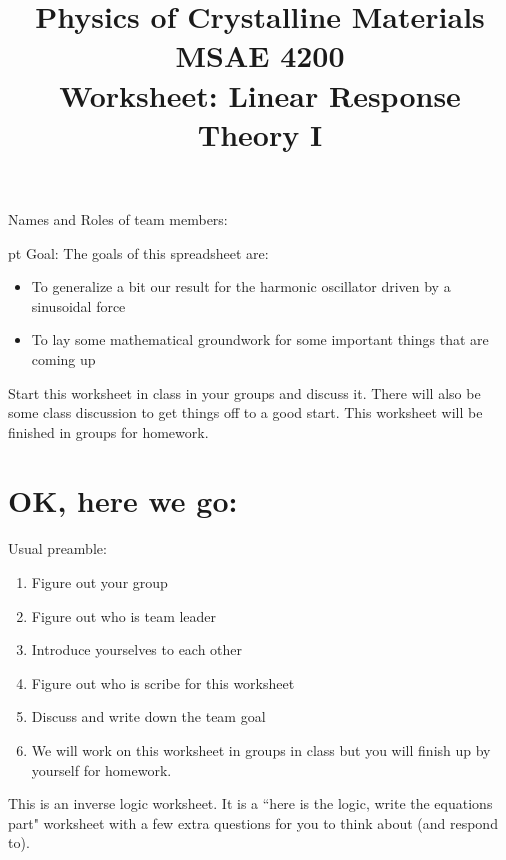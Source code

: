 \documentclass[]{revtex4}
\begin{document}
\title{Physics of Crystalline Materials\\
  MSAE 4200\\
  Worksheet: Linear Response Theory I}

\maketitle

\vskip 24pt
  {Names and Roles of team members:}

 pt
Goal: The goals of this spreadsheet are:
\begin{itemize}
  \item To generalize a bit our result for the harmonic oscillator driven by a sinusoidal force
  \item To lay some mathematical groundwork for some important things that are coming up
\end{itemize}

\cork{}
\vskip 12pt



Start this worksheet in class in your groups and discuss it.  There will also be some class
discussion to get things off to a good start.  This worksheet will be finished in groups for
homework.

\section*{OK, here we go:}
Usual preamble:
\begin{enumerate}
  \item Figure out your group
  \item Figure out who is team leader
  \item Introduce yourselves to each other
  \item Figure out who is scribe for this worksheet
  \item Discuss and write down the team goal
  \item We will work on this worksheet in groups in class but you will finish up by yourself for homework.
\end{enumerate}

This is an inverse logic worksheet.  It is a
``here is the logic, write the equations part" worksheet with a few extra questions for you to think about (and respond to).
\end{document}
